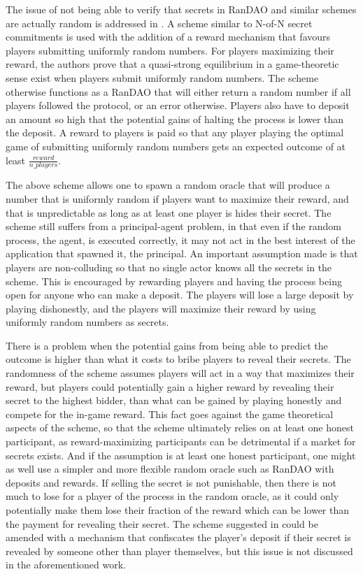 The issue of not being able to verify that secrets in RanDAO and similar schemes are actually random is addressed in \cite{chatterjee_probabilistic_2019}. A scheme similar to N-of-N secret commitments is used with the addition of a reward mechanism that favours players submitting uniformly random numbers. For players maximizing their reward, the authors prove that a quasi-strong equilibrium in a game-theoretic sense exist when players submit uniformly random numbers. The scheme otherwise functions as a RanDAO that will either return a random number if all players followed the protocol, or an error otherwise. Players also have to deposit an amount so high that the potential gains of halting the process is lower than the deposit. A reward to players is paid so that any player playing the optimal game of submitting uniformly random numbers gets an expected outcome of at least $\frac{reward}{n\_players}$. 

The above scheme allows one to spawn a random oracle that will produce a number that is uniformly random if players want to maximize their reward, and that is unpredictable as long as at least one player is hides their secret. The scheme still suffers from a principal-agent problem, in that even if the random process, the agent, is executed correctly, it may not act in the best interest of the application that spawned it, the principal. An important assumption made is that players are non-colluding so that no single actor knows all the secrets in the scheme. This is encouraged by rewarding players and having the process being open for anyone who can make a deposit. The players will lose a large deposit by playing dishonestly, and the players will maximize their reward by using uniformly random numbers as secrets.

There is a problem when the potential gains from being able to predict the outcome is higher than what it costs to bribe players to reveal their secrets. The randomness of the scheme assumes players will act in a way that maximizes their reward, but players could potentially gain a higher reward by revealing their secret to the highest bidder, than what can be gained by playing honestly and compete for the in-game reward. This fact goes against the game theoretical aspects of the scheme, so that the scheme ultimately relies on at least one honest participant, as reward-maximizing participants can be detrimental if a market for secrets exists. And if the assumption is at least one honest participant, one might as well use a simpler and more flexible random oracle such as RanDAO with deposits and rewards. If selling the secret is not punishable, then there is not much to lose for a player of the process in the random oracle, as it could only potentially make them lose their fraction of the reward which can be lower than the payment for revealing their secret. The scheme suggested in \cite{chatterjee_probabilistic_2019} could be amended with a mechanism that confiscates the player's deposit if their secret is revealed by someone other than player themselves, but this issue is not discussed in the aforementioned work.
